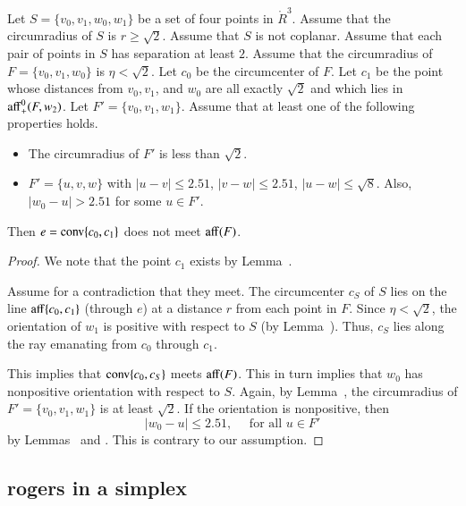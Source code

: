 \newpage

\begin{lemma}
Let $S=\{v_0,v_1,w_0,w_1\}$ be a set of four points in $\ring{R}^3$.
Assume that the circumradius of $S$ is $r\ge \sqrt2$.  Assume
that $S$ is not coplanar.  Assume that each pair of points
in $S$ has separation at least $2$.  Assume
that the circumradius of $F=\{v_0,v_1,w_0\}$ is
  $\eta < \sqrt2$.   Let $c_0$ be the circumcenter of $F$.
Let $c_1$ be the point whose distances from $v_0,v_1$, and $w_0$ are
all exactly $\sqrt2$ and which lies in
${\operatorname{aff}}^0_+(F,w_2)$.
Let $F'=\{v_0,v_1,w_1\}$.  Assume that at least one of
the following
properties holds.
\begin{itemize}
  \item The circumradius of $F'$ is less than $\sqrt2$.
  \item $F'=\{u,v,w\}$ with $|u-v| \le 2.51$, $|v-w|\le 2.51$,
        $|u-w|\le\sqrt8$. Also, $|w_0-u|>2.51$ for some $u\in F'$.
\end{itemize}

Then $e={\operatorname{conv}}\{c_0,c_1\}$ does not
meet ${\operatorname{aff}}(F)$.
\end{lemma}

\begin{proof}   We note that the point $c_1$ exists 
by Lemma~.

Assume for a contradiction that they meet.
The circumcenter $c_S$ of $S$ lies on
the line ${\operatorname{aff}}\{c_0,c_1\}$ (through $e$) at a
distance $r$ from each point in $F$.  
Since $\eta < \sqrt2$, the orientation of $w_1$ is positive
with respect to $S$ (by Lemma~). 
Thus, $c_S$ lies along
the ray emanating from $c_0$ through $c_1$.  

This implies that ${\operatorname{conv}}\{c_0,c_S\}$ meets ${\operatorname{aff}}(F)$.
This in turn implies that $w_0$ has nonpositive orientation with
respect to $S$.  Again, by Lemma~, the
circumradius of $F'=\{v_0,v_1,w_1\}$ is at least $\sqrt2$.
If the orientation is
nonpositive, then 
   $$|w_0-u|\le 2.51,\quad\text{ for all } u\in F'$$
by Lemmas~ and
. This is contrary to our assumption.
\end{proof}
\newpage

\subsection{rogers in a simplex}

